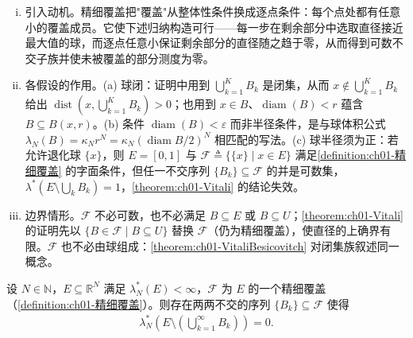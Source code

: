 \documentclass[../../main.tex]{subfiles}%
\begin{document}
\begin{remark}\label{remark:ch01-精细覆盖约定}
\begin{enumerate}[(i)]
\item 引入动机。精细覆盖把"覆盖"从整体性条件换成逐点条件：每个点处都有任意小的覆盖成员。它使下述归纳构造可行——每一步在剩余部分中选取直径接近最大值的球，而逐点任意小保证剩余部分的直径随之趋于零，从而得到可数不交子族并使未被覆盖的部分测度为零。
\item 各假设的作用。(a) 球闭：证明中用到 $\bigcup_{k=1}^KB_k$ 是闭集，从而 $x\notin\bigcup_{k=1}^KB_k$ 给出 $\operatorname{dist}(x,\bigcup_{k=1}^KB_k)>0$；也用到 $x\in B$、$\operatorname{diam}(B)<r$ 蕴含 $B\subseteq B(x,r)$。(b) 条件 $\operatorname{diam}(B)<\varepsilon$ 而非半径条件，是与球体积公式 $\lambda_N(B)=\kappa_Nr^N=\kappa_N(\operatorname{diam}B/2)^N$ 相匹配的写法。(c) 球半径须为正：若允许退化球 $\{x\}$，则 $E=[0,1]$ 与 $\mathcal{F}\triangleq\{\{x\}\mid x\in E\}$ 满足\cref{definition:ch01-精细覆盖} 的字面条件，但任一不交序列 $\{B_k\}\subseteq\mathcal{F}$ 的并是可数集，$\lambda^*(E\setminus\bigcup_kB_k)=1$，\cref{theorem:ch01-Vitali} 的结论失效。
\item 边界情形。$\mathcal{F}$ 不必可数，也不必满足 $B\subseteq E$ 或 $B\subseteq U$；\cref{theorem:ch01-Vitali} 的证明先以 $\{B\in\mathcal{F}\mid B\subseteq U\}$ 替换 $\mathcal{F}$（仍为精细覆盖），使直径的上确界有限。$\mathcal{F}$ 也不必由球组成：\cref{theorem:ch01-VitaliBesicovitch} 对闭集族叙述同一概念。
\end{enumerate}
\end{remark}

\begin{theorem}\label{theorem:ch01-Vitali}
设 $N\in\mathbb{N}$，$E\subseteq\mathbb{R}^N$ 满足 $\lambda_N^*(E)<\infty$，$\mathcal{F}$ 为 $E$ 的一个精细覆盖（\cref{definition:ch01-精细覆盖}）。则存在两两不交的序列 $\{B_k\}\subseteq\mathcal{F}$ 使得
\begin{align*}
\lambda_N^*\left(E\setminus\left(\bigcup_{k=1}^\infty B_k\right)\right)=0.
\end{align*}
\end{theorem}
\end{document}

